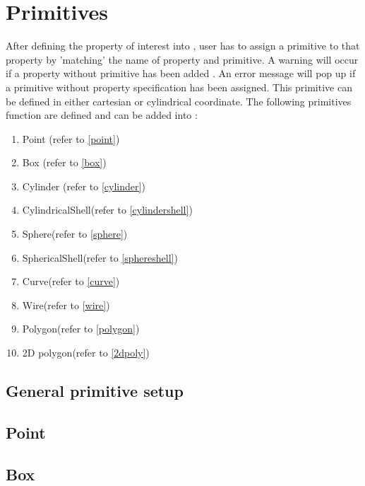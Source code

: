 \section{Primitives}\label{csx_primitive} 

After defining the property of interest into 
\label{CSX}, user has to assign a primitive to that property by 'matching' the name of property and primitive. A warning will occur if a property without primitive has been added \label{CSX}. An error message will pop up if a primitive without property specification has been assigned. This primitive can be defined in either cartesian or cylindrical coordinate. The following primitives function are defined and can be added into \label{CSX}:   
\begin{enumerate}
\item{Point} (refer to \ref{point})
\item{Box} (refer to \ref{box})
\item{Cylinder} (refer to \ref{cylinder})
\item{CylindricalShell}(refer to \ref{cylindershell})
\item{Sphere}(refer to \ref{sphere})
\item{SphericalShell}(refer to \ref{sphereshell})
\item{Curve}(refer to \ref{curve})
\item{Wire}(refer to \ref{wire})
\item{Polygon}(refer to \ref{polygon})
\item{2D polygon}(refer to \ref{2dpoly})
\end{enumerate}

\subsection{General primitive setup} \label{prim_setup}


\subsection{Point} \label{point}


\subsection{Box} \label{box}


